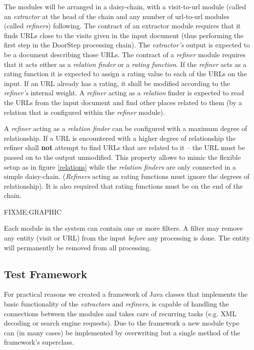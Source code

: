 \documentclass[a4paper]{danarticle}
\theoremstyle{remark}
\begin{document}
      The modules will be arranged in a daisy-chain, with a visit-to-url module 
      (called an \textit{extractor} at the head of the chain and any number of 
      url-to-url modules (called \textit{refiners}) following. The contract of 
      an extractor module requires that it finds URLs close to the visits given 
      in the input document (thus performing the first step in the DoorStep 
      processing chain). The \textit{extractor's} output is expected to be a 
      document describing those URLs. The contract of a \textit{refiner} module 
      requires that it acts either as a \textit{relation finder} or a 
      \textit{rating function}. If the \textit{refiner} acts as a rating 
      function it is expected to assign a rating value to each of the URLs on 
      the input. If an URL already has a rating, it shall be modified according 
      to the \textit{refiner's} internal weight. A \textit{refiner} acting as a 
      \textit{relation} finder is expected to read the URLs from the input 
      document and find other places related to them (by a relation that is 
      configured within the \textit{refiner} module).
      
      A \textit{refiner} acting as a \textit{relation finder} can be configured 
      with a maximum degree of relationship. If a URL is encountered with a 
      higher degree of relationship the refiner shall \textbf{not} attempt to 
      find URLs that are related to it -- the URL must be passed on to the 
      output unmodified. This property allows to mimic the flexible setup as in 
      figure \ref{relations} while the \textit{relation finders} are only 
      connected in a simple daisy-chain. (\textit{Refiners} acting as rating 
      functions must ignore the degrees of relationship). It is also required 
      that rating functions must be on the end of the chain.
      
      FIXME:GRAPHIC
      
      Each module in the system can contain one or more filters. A filter may 
      remove any entity (visit or URL) from the input \textit{before} any 
      processing is done. The entity will permanently be removed from all 
      processing.
    \subsection{Test Framework}
      For practical reasons we created a framework of Java classes that 
      implements the basic functionality of the \textit{extractors} and 
      \textit{refiners}, is capable of handling the connections between the 
      modules and takes care of recurring tasks (e.g. XML decoding or search 
      engine requests). Due to the framework a new module type can (in many 
      cases) be implemented by overwriting but a single method of the 
      framework's superclass.
      
\end{document}
